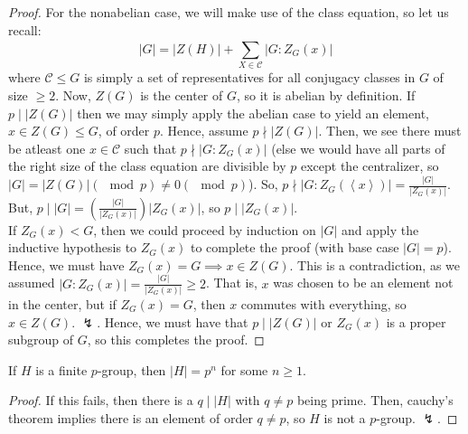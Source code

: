 \begin{proof}
	\newline
	For the nonabelian case, we will make use of the class equation, so let us recall: \[
		\left| G \right| = \left| Z\left( H \right)  \right| + \sum_{X \in \mathscr{C}}^{} \left| G:Z_{G}\left( x \right)  \right|
	\]  where \(\mathscr{C}\le G\) is simply a set of representatives for all conjugacy classes in \(G\) of size \(\ge 2\). Now, \(Z\left( G \right) \) is the center of \(G\), so it is abelian by definition. If \(p \mid \left| Z\left( G \right) \right| \) then we may simply apply the abelian case to yield an element, \(x \in Z\left( G \right) \le G\), of order \(p\). Hence, assume \(p \nmid \left| Z\left( G \right)  \right| \). Then, we see there must be atleast one \(x \in \mathscr{C}\) such that \(p \nmid \left| G:Z_{G}\left( x \right)  \right| \) (else we would have all parts of the right size of the class equation are divisible by \(p\) except the centralizer, so \(\left| G \right|  = \left| Z\left( G \right)  \right| (\mod p) \neq 0 (\mod p) \)). So, \(p \nmid \left| G: Z_{G}\left( \left<x \right>  \right)  \right|  = \frac{\left| G \right| }{\left| Z_{G}\left( x \right)  \right| }\). But, \(p \mid \left| G \right| = \left( \frac{\left| G \right| }{\left| Z_{G}\left( x \right)  \right| } \right) \left| Z_{G}\left( x \right)  \right| \), so \(p \mid \left| Z_{G}\left( x \right)  \right| \).\\
	If \(Z_{G}\left( x \right) < G\), then we could proceed by induction on \(\left| G \right| \) and apply the inductive hypothesis to \(Z_{G}\left( x \right) \) to complete the proof (with base case \(\left| G \right| = p\)). Hence, we must have \(Z_{G}\left( x \right) = G \implies x \in Z\left( G \right) \). This is a contradiction, as we assumed \(\left| G: Z_{G}\left( x \right)  \right| = \frac{\left| G \right| }{\left| Z_{G}\left( x \right)  \right| }\ge 2\). That is, \(x\) was chosen to be an element not in the center, but if \(Z_{G}\left( x \right) = G\), then \(x\) commutes with everything, so \(x \in Z \left( G \right) \). \(\lightning\). Hence, we must have that \(p \mid \left| Z\left( G \right)  \right| \) or \(Z_{G}\left( x \right) \) is a proper subgroup of \(G\), so this completes the proof.
\end{proof}
\newpage
\begin{corollary}
	If \(H\) is a finite \(p\)-group, then \(\left| H \right|  = p^{n}\) for some \(n\ge 1\).
\end{corollary}
\begin{proof}
	If this fails, then there is a \(q \mid \left| H \right| \) with \(q\neq p\) being prime. Then, cauchy's theorem implies there is an element of order \(q \neq p\), so \(H\) is not a \(p\)-group. \(\lightning\).
\end{proof}
